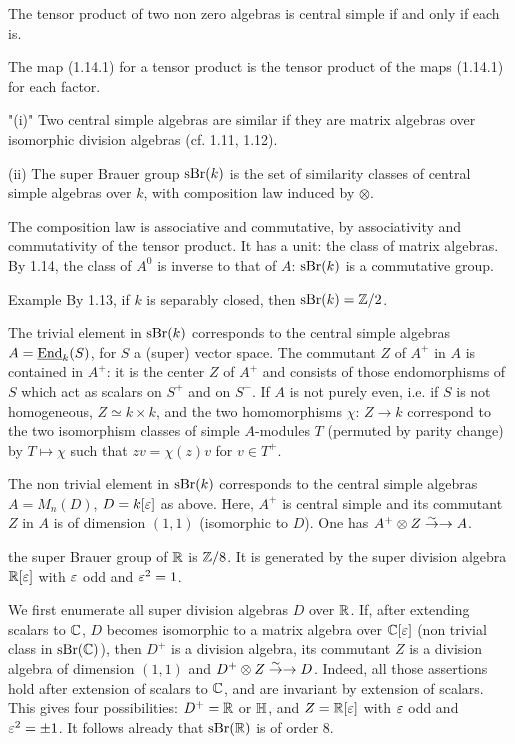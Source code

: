 The tensor product of two non zero algebras is central
simple if and only if each is.
\endproclaim

The map (1.14.1) for a tensor product is the tensor
product of the maps (1.14.1) for each factor.
\enddemo

\roster
\runinitem"(i)"
Two central simple algebras are {\rm similar} if they
are matrix algebras over isomorphic division algebras
(cf. 1.11, 1.12).
\endroster

\noindent
{\rm (ii)}\enspace
The {\rm super Brauer group} $\text{\rm sBr}(k)$ is the set of 
similarity classes of central simple algebras over $k$,
with composition law induced by $\otimes$.
\endproclaim

The composition law is associative and commutative, by
associativity and commutativity of the tensor product.
It has a unit: the class of matrix algebras.
By 1.14, the class of $A^0$ is inverse to that of $A$:
$\text{\rm sBr}(k)$ is a commutative group.

 Example
\endsubhead
By 1.13, if $k$ is separably closed, then
$\text{\rm sBr}(k)={\Bbb Z}/2$.

The trivial element in $\text{\rm sBr}(k)$ corresponds to the
central simple algebras $A=\underline{\text{\rm End}}_k(S)$, for
$S$ a (super) vector space.
The commutant $Z$ of $A^+$ in $A$ is contained in
$A^+$:
it is the center $Z$ of $A^+$ and consists of those
endomorphisms of $S$ which act as scalars on 
$S^+$ and on $S^-$.
If $A$ is not purely even, i.e. if $S$ is not
homogeneous, $Z\simeq k\times k$, and the two
homomorphisms $\chi\colon\,Z\to k$ correspond to the
two isomorphism classes of simple $A$-modules $T$ (permuted
by parity change) by $T\mapsto \chi$ such that $zv=\chi(z)v$
for $v\in T^+$.

The non trivial element in $\text{\rm sBr}(k)$ corresponds to the
central simple algebras $A=M_n(D)$, $D=k[{\varepsilon}]$ as
above.
Here, $A^+$ is central simple and its commutant $Z$ in
$A$ is of dimension $(1,1)$ (isomorphic to $D$).
One has $A^+\otimes Z\overset\sim\to\rightarrow A$.

the super Brauer group of ${\Bbb R}$ is ${\Bbb Z}/8$.
It is generated by the super division algebra
${\Bbb R}[{\varepsilon}]$ with ${\varepsilon}$ odd and ${\varepsilon}^2=1$.
\endproclaim

We first enumerate all super division algebras $D$ over
${\Bbb R}$.
If, after extending scalars to ${\Bbb C}$, $D$ becomes
isomorphic to a matrix algebra over ${\Bbb C}[{\varepsilon}]$ (non
trivial class in $\text{\rm sBr}({\Bbb C})$), then $D^+$ is a
division algebra, its commutant $Z$ is a division
algebra of dimension $(1,1)$ and $D^+\otimes
Z\overset\sim\to\rightarrow D$.
Indeed, all those assertions hold after extension of
scalars to ${\Bbb C}$, and are invariant by extension of
scalars.
This gives four possibilities: $D^+={\Bbb R}$ or ${\Bbb H}$,
and $Z={\Bbb R}[{\varepsilon}]$ with ${\varepsilon}$ odd and ${\varepsilon}^2=\pm 1$.
It follows already that $\text{\rm sBr}({\Bbb R})$ is of order $8$.

